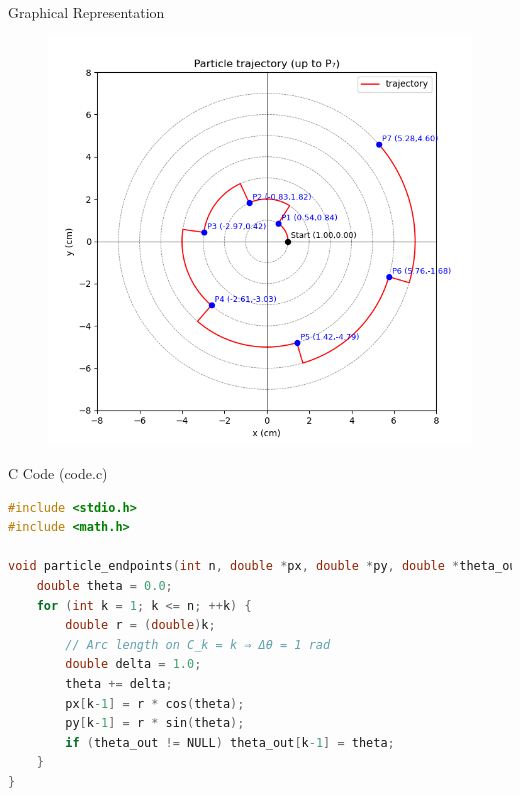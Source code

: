 \documentclass{beamer}
\begin{document}
\begin{frame}{Graphical Representation}
\begin{figure}[h!]
    \centering
    \includegraphics[height=0.5\textheight, keepaspectratio]{figs/fig.png}
    \label{figure_1}
\end{figure}
\end{frame}


\begin{frame}[fragile]{C Code (code.c)}
\begin{lstlisting}[language=C]
#include <stdio.h>
#include <math.h>

void particle_endpoints(int n, double *px, double *py, double *theta_out) {
    double theta = 0.0;
    for (int k = 1; k <= n; ++k) {
        double r = (double)k;
        // Arc length on C_k = k ⇒ Δθ = 1 rad
        double delta = 1.0;
        theta += delta;
        px[k-1] = r * cos(theta);
        py[k-1] = r * sin(theta);
        if (theta_out != NULL) theta_out[k-1] = theta;
    }
}
\end{lstlisting}
\end{frame}

\end{document}
